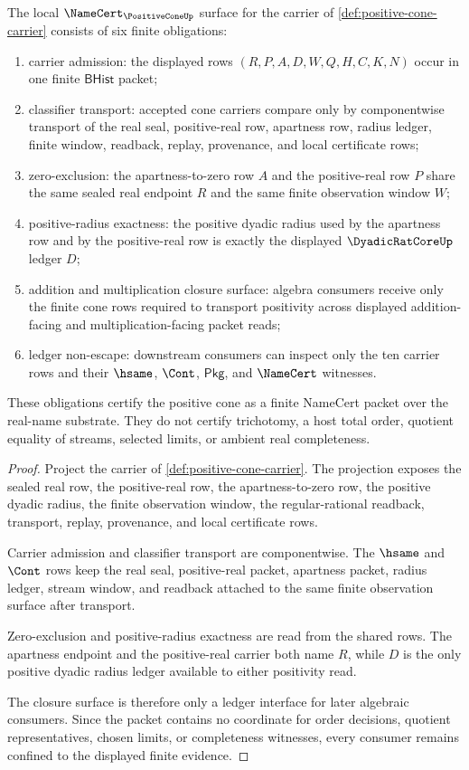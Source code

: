 \begin{theorem}
\label{thm:positive-cone-namecert-obligations}
The local $\NameCert_{\PositiveConeUp}$ surface for the carrier of
\autoref{def:positive-cone-carrier} consists of six finite obligations:
\begin{enumerate}
\item carrier admission: the displayed rows $(R,P,A,D,W,Q,H,C,K,N)$ occur in
one finite $\mathsf{BHist}$ packet;
\item classifier transport: accepted cone carriers compare only by
componentwise transport of the real seal, positive-real row, apartness row,
radius ledger, finite window, readback, replay, provenance, and local
certificate rows;
\item zero-exclusion: the apartness-to-zero row $A$ and the positive-real row
$P$ share the same sealed real endpoint $R$ and the same finite observation
window $W$;
\item positive-radius exactness: the positive dyadic radius used by the
apartness row and by the positive-real row is exactly the displayed
$\DyadicRatCoreUp$ ledger $D$;
\item addition and multiplication closure surface: algebra consumers receive
only the finite cone rows required to transport positivity across displayed
addition-facing and multiplication-facing packet reads;
\item ledger non-escape: downstream consumers can inspect only the ten carrier
rows and their $\hsame$, $\Cont$, $\mathsf{Pkg}$, and $\NameCert$ witnesses.
\end{enumerate}
These obligations certify the positive cone as a finite NameCert packet over
the real-name substrate. They do not certify trichotomy, a host total order,
quotient equality of streams, selected limits, or ambient real completeness.
\end{theorem}
\begin{proof}
Project the carrier of \autoref{def:positive-cone-carrier}. The projection
exposes the sealed real row, the positive-real row, the apartness-to-zero row,
the positive dyadic radius, the finite observation window, the
regular-rational readback, transport, replay, provenance, and local
certificate rows.

Carrier admission and classifier transport are componentwise. The $\hsame$ and
$\Cont$ rows keep the real seal, positive-real packet, apartness packet, radius
ledger, stream window, and readback attached to the same finite observation
surface after transport.

Zero-exclusion and positive-radius exactness are read from the shared rows.
The apartness endpoint and the positive-real carrier both name $R$, while $D$
is the only positive dyadic radius ledger available to either positivity read.

The closure surface is therefore only a ledger interface for later algebraic
consumers. Since the packet contains no coordinate for order decisions,
quotient representatives, chosen limits, or completeness witnesses, every
consumer remains confined to the displayed finite evidence.
\end{proof}

